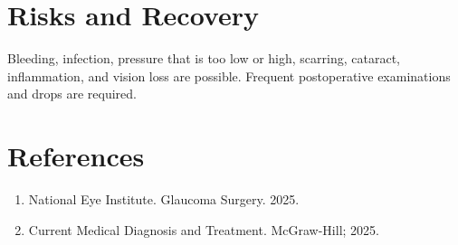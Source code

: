 \section*{Risks and Recovery}
Bleeding, infection, pressure that is too low or high, scarring, cataract, inflammation, and vision loss are possible. Frequent postoperative examinations and drops are required.
\section*{References}
\begin{enumerate}\item National Eye Institute. Glaucoma Surgery. 2025.\item Current Medical Diagnosis and Treatment. McGraw-Hill; 2025.\end{enumerate}
\clearpage
